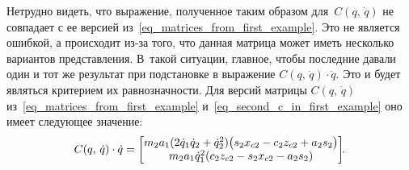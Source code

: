 Нетрудно видеть, что выражение, полученное таким образом для~$C(q,\,\dot{q})$ не совпадает с ее версией из~\eqref{eq_matrices_from_first_example}.
Это не является ошибкой, а происходит из-за того, что данная матрица может иметь несколько вариантов представления.
В~такой ситуации, главное, чтобы последние давали один и тот же результат при подстановке в выражение $C(q,\,\dot{q}) \cdot \dot{q}$.
Это и будет являться критерием их равнозначности.
Для версий матрицы $C(q,\,\dot{q})$ из~\eqref{eq_matrices_from_first_example} и~\eqref{eq_second_c_in_first_example} оно имеет следующее значение:
\begin{equation}
    C(q,\,\dot{q}) \cdot \dot{q} =
    \begin{bmatrix}
        m_2 a_1 (2 \dot{q}_1 \dot{q}_2 + \dot{q}_2^2) \bigl( s_2 x_{c2} - c_2 z_{c2} + a_2 s_2 \bigr) \\
        m_2 a_1 \dot{q}_1^2 (c_2 z_{c2} - s_2 x_{c2} - a_2 s_2)
    \end{bmatrix}\!\!\ldotp
\end{equation}
